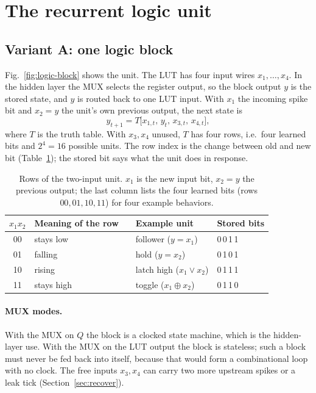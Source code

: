 \section{The recurrent logic unit}
\label{sec:unit}

\subsection{Variant A: one logic block}
Fig.~\ref{fig:logic-block} shows the unit. The LUT has four input wires $x_1,\dots,x_4$. In the hidden layer the MUX selects the register output, so the block output $y$ is the stored state, and $y$ is routed back to one LUT input. With $x_1$ the incoming spike bit and $x_2=y$ the unit's own previous output, the next state is
\begin{equation}
y_{t+1} = T\bigl[x_{1,t},\,y_t,\,x_{3,t},\,x_{4,t}\bigr],
\end{equation}
where $T$ is the truth table. With $x_3,x_4$ unused, $T$ has four rows, i.e.\ four learned bits and $2^4=16$ possible units. The row index is the change between old and new bit (Table~\ref{tab:rows}); the stored bit says what the unit does in response.

\begin{table}[t]
\centering
\caption{Rows of the two-input unit. $x_1$ is the new input bit, $x_2=y$ the previous output; the last column lists the four learned bits (rows $00,01,10,11$) for four example behaviors.}
\label{tab:rows}
\begin{tabular}{@{}cll@{\qquad}ll@{}}
\toprule
$x_1x_2$ & Meaning of the row & & Example unit & Stored bits\\
\midrule
00 & stays low & & follower ($y=x_1$) & 0\,0\,1\,1\\
01 & falling & & hold ($y=x_2$) & 0\,1\,0\,1\\
10 & rising & & latch high ($x_1\lor x_2$) & 0\,1\,1\,1\\
11 & stays high & & toggle ($x_1\oplus x_2$) & 0\,1\,1\,0\\
\bottomrule
\end{tabular}
\end{table}

\paragraph{MUX modes.} With the MUX on $Q$ the block is a clocked state machine, which is the hidden-layer use. With the MUX on the LUT output the block is stateless; such a block must never be fed back into itself, because that would form a combinational loop with no clock. The free inputs $x_3,x_4$ can carry two more upstream spikes or a leak tick (Section~\ref{sec:recover}).

